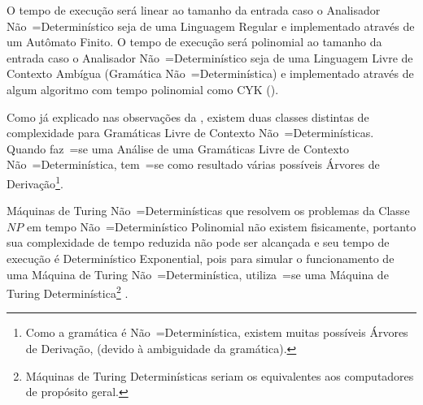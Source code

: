 O tempo de execução será linear ao tamanho da entrada caso o Analisador Não~=Determinístico seja de uma Linguagem Regular e
implementado através de um Autômato Finito.
O tempo de execução será polinomial ao tamanho da entrada caso o Analisador Não~=Determinístico seja de uma Linguagem Livre de Contexto Ambígua (Gramática Não~=Determinística) e
implementado através de algum algoritmo com tempo polinomial como CYK ().

Como já explicado nas observações da ,
existem duas classes distintas de complexidade para Gramáticas Livre de Contexto Não~=Determinísticas.
Quando faz~=se uma Análise de uma Gramáticas Livre de Contexto Não~=Determinística,
tem~=se como resultado várias possíveis Árvores de Derivação\footnote{
Como a gramática é Não~=Determinística,
existem muitas possíveis Árvores de Derivação,
(devido à ambiguidade da gramática).
}.




Máquinas de Turing Não~=Determinísticas que resolvem os problemas da Classe $NP$ em tempo Não~=Determinístico Polinomial não existem fisicamente,
portanto sua complexidade de tempo reduzida não pode ser alcançada e
seu tempo de execução é Determinístico Exponential,
pois para simular o funcionamento de uma Máquina de Turing Não~=Determinística,
utiliza~=se uma Máquina de Turing Determinística\footnote{
Máquinas de Turing Determinísticas seriam os equivalentes aos computadores de propósito geral.
}
\cite{sipserBook,turingMachinesRoyer}.

